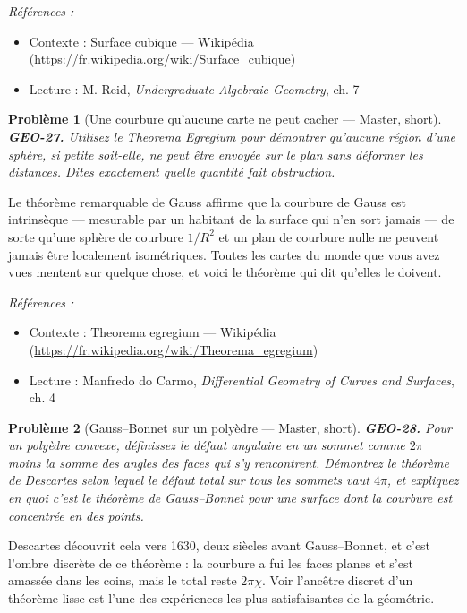 \documentclass[11pt]{article}
\newtheorem{problem}{Problème}
\newenvironment{refs}{\par\small\noindent\emph{Références :}\begin{itemize}\setlength\itemsep{0pt}}{\end{itemize}\normalsize}
\begin{document}
\begin{refs}
\item Contexte : Surface cubique --- Wikipédia (\url{https://fr.wikipedia.org/wiki/Surface_cubique})
\item Lecture : M. Reid, \textit{Undergraduate Algebraic Geometry}, ch. 7
\end{refs}

\bigskip

\begin{problem}[{Une courbure qu'aucune carte ne peut cacher --- Master, short}]
\textbf{GEO-27.} Utilisez le Theorema Egregium pour démontrer qu'aucune région d'une sphère, si petite soit-elle, ne peut être envoyée sur le plan sans déformer les distances. Dites exactement quelle quantité fait obstruction.
\end{problem}

\noindent Le \og{} théorème remarquable \fg{} de Gauss affirme que la courbure de Gauss est intrinsèque --- mesurable par un habitant de la surface qui n'en sort jamais --- de sorte qu'une sphère de courbure $ 1/R^2 $ et un plan de courbure nulle ne peuvent jamais être localement isométriques. Toutes les cartes du monde que vous avez vues mentent sur quelque chose, et voici le théorème qui dit qu'elles le doivent.

\begin{refs}
\item Contexte : Theorema egregium --- Wikipédia (\url{https://fr.wikipedia.org/wiki/Theorema_egregium})
\item Lecture : Manfredo do Carmo, \textit{Differential Geometry of Curves and Surfaces}, ch. 4
\end{refs}

\bigskip

\begin{problem}[{Gauss--Bonnet sur un polyèdre --- Master, short}]
\textbf{GEO-28.} Pour un polyèdre convexe, définissez le défaut angulaire en un sommet comme $ 2\pi $ moins la somme des angles des faces qui s'y rencontrent. Démontrez le théorème de Descartes selon lequel le défaut total sur tous les sommets vaut $ 4\pi $, et expliquez en quoi c'est le théorème de Gauss--Bonnet pour une surface dont la courbure est concentrée en des points.
\end{problem}

\noindent Descartes découvrit cela vers 1630, deux siècles avant Gauss--Bonnet, et c'est l'ombre discrète de ce théorème : la courbure a fui les faces planes et s'est amassée dans les coins, mais le total reste $ 2\pi \chi $. Voir l'ancêtre discret d'un théorème lisse est l'une des expériences les plus satisfaisantes de la géométrie.
\end{document}
